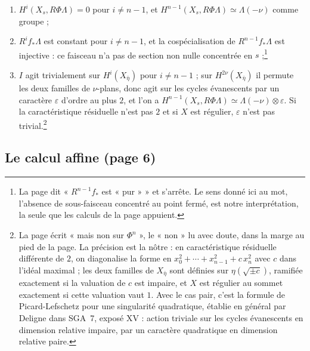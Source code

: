 \documentclass[11pt,a4paper]{article}
\begin{document}
\begin{enumerate}
\item[a)] $H^{i}(X_{s}, R\Phi\Lambda) = 0$ pour $i \neq n - 1$, et
$H^{n-1}(X_{s}, R\Phi\Lambda) \simeq \Lambda(-\nu)$ comme groupe ;
\item[b)] $R^{i}f_{*}\Lambda$ est constant pour $i \neq n - 1$, et la
cospécialisation de $R^{n-1}f_{*}\Lambda$ est injective : ce faisceau n'a
pas de section non nulle concentrée en $s$ ;\footnote{La page dit
« $R^{n-1}f_{*}$ est « pur »  » et s'arrête. Le sens donné ici au
mot, l'absence de sous-faisceau concentré au point fermé, est notre
interprétation, la seule que les calculs de la page appuient.}
\item[c)] $I$ agit trivialement sur $H^{i}(X_{\bar\eta})$ pour
$i \neq n - 1$ ; sur $H^{2\nu}(X_{\bar\eta})$ il permute les deux familles
de $\nu$-plans, donc agit sur les cycles évanescents par un caractère
$\varepsilon$ d'ordre au plus $2$, et l'on a
$H^{n-1}(X_{s}, R\Phi\Lambda) \simeq \Lambda(-\nu) \otimes \varepsilon$. Si
la caractéristique résiduelle n'est pas $2$ et si $X$ est régulier,
$\varepsilon$ n'est pas trivial.\footnote{La page écrit « mais
non sur $\Phi^{n}$ », le « non » lu avec doute, dans la marge
au pied de la page. La précision est la nôtre : en caractéristique
résiduelle différente de $2$, on diagonalise la forme en
$x_{0}^{2} + \cdots + x_{n-1}^{2} + c\,x_{n}^{2}$ avec $c$ dans l'idéal
maximal ; les deux familles de $X_{\bar\eta}$ sont définies sur
$\eta(\sqrt{\pm c})$, ramifiée exactement si la valuation de $c$ est
impaire, et $X$ est régulier au sommet exactement si cette valuation vaut
$1$. Avec le cas pair, c'est la formule de Picard-Lefschetz pour une
singularité quadratique, établie en général par Deligne dans SGA~7,
exposé XV : action triviale sur les cycles évanescents en dimension
relative impaire, par un caractère quadratique en dimension relative
paire.}
\end{enumerate}

\subsection*{Le calcul affine (page 6)}
\end{document}
